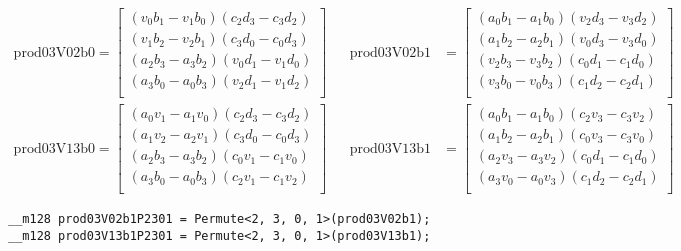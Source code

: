 \documentclass[]{scrartcl}
\newcommand{\pth}[1]{\left(#1\right)}
\begin{document}
\begin{align*}
\mathrm{prod03V02b0} 
=
\begin{bmatrix}
\pth{v_0b_1 - v_1b_0}\pth{c_2d_3 - c_3d_2}\\
\pth{v_1b_2 - v_2b_1}\pth{c_3d_0 - c_0d_3}\\
\pth{a_2b_3 - a_3b_2}\pth{v_0d_1 - v_1d_0}\\
\pth{a_3b_0 - a_0b_3}\pth{v_2d_1 - v_1d_2}\\
\end{bmatrix}
&&
\mathrm{prod03V02b1} 
&=
\begin{bmatrix}
\pth{a_0b_1 - a_1b_0}\pth{v_2d_3 - v_3d_2}\\
\pth{a_1b_2 - a_2b_1}\pth{v_0d_3 - v_3d_0}\\
\pth{v_2b_3 - v_3b_2}\pth{c_0d_1 - c_1d_0}\\
\pth{v_3b_0 - v_0b_3}\pth{c_1d_2 - c_2d_1}\\
\end{bmatrix}
\\
\mathrm{prod03V13b0} 
=
\begin{bmatrix}
\pth{a_0v_1 - a_1v_0}\pth{c_2d_3 - c_3d_2}\\
\pth{a_1v_2 - a_2v_1}\pth{c_3d_0 - c_0d_3}\\
\pth{a_2b_3 - a_3b_2}\pth{c_0v_1 - c_1v_0}\\
\pth{a_3b_0 - a_0b_3}\pth{c_2v_1 - c_1v_2}\\
\end{bmatrix}
&&
\mathrm{prod03V13b1} 
&=
\begin{bmatrix}
\pth{a_0b_1 - a_1b_0}\pth{c_2v_3 - c_3v_2}\\
\pth{a_1b_2 - a_2b_1}\pth{c_0v_3 - c_3v_0}\\
\pth{a_2v_3 - a_3v_2}\pth{c_0d_1 - c_1d_0}\\
\pth{a_3v_0 - a_0v_3}\pth{c_1d_2 - c_2d_1}\\
\end{bmatrix}
\end{align*}


\begin{verbatim}
__m128 prod03V02b1P2301 = Permute<2, 3, 0, 1>(prod03V02b1);
__m128 prod03V13b1P2301 = Permute<2, 3, 0, 1>(prod03V13b1);
\end{verbatim}
\end{document}
